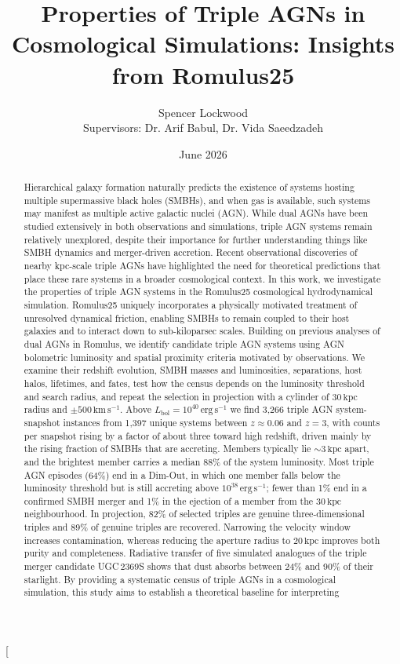 \documentclass[twocolumn, 10pt]{article}
\title{Properties of Triple AGNs in Cosmological Simulations: Insights from Romulus25}
\author{Spencer Lockwood \\ \small Supervisors: Dr. Arif Babul, Dr. Vida Saeedzadeh}
\date{June 2026}
\begin{document}
\onecolumn          %
\tableofcontents
\newpage

\twocolumn[
\begin{@twocolumnfalse}
\maketitle

\begin{abstract}
Hierarchical galaxy formation naturally predicts the existence of systems hosting multiple supermassive black holes (SMBHs), and when gas is available, such systems may manifest as multiple active galactic nuclei (AGN). While dual AGNs have been studied extensively in both observations and simulations, triple AGN systems remain relatively unexplored, despite their importance for further understanding things like SMBH dynamics and merger-driven accretion. Recent observational discoveries of nearby kpc-scale triple AGNs have highlighted the need for theoretical predictions that place these rare systems in a broader cosmological context. In this work, we investigate the properties of triple AGN systems in the Romulus25 cosmological hydrodynamical simulation. Romulus25 uniquely incorporates a physically motivated treatment of unresolved dynamical friction, enabling SMBHs to remain coupled to their host galaxies and to interact down to sub-kiloparsec scales. Building on previous analyses of dual AGNs in Romulus, we identify candidate triple AGN systems using AGN bolometric luminosity and spatial proximity criteria motivated by observations. We examine their redshift evolution, SMBH masses and luminosities, separations, host halos, lifetimes, and fates, test how the census depends on the luminosity threshold and search radius, and repeat the selection in projection with a cylinder of $30\,\mathrm{kpc}$ radius and $\pm 500\,\mathrm{km\,s^{-1}}$. Above $L_\mathrm{bol} = 10^{40}\,\mathrm{erg\,s^{-1}}$ we find 3,266 triple AGN system-snapshot instances from 1,397 unique systems between $z \approx 0.06$ and $z = 3$, with counts per snapshot rising by a factor of about three toward high redshift, driven mainly by the rising fraction of SMBHs that are accreting. Members typically lie $\sim 3\,\mathrm{kpc}$ apart, and the brightest member carries a median 88\% of the system luminosity. Most triple AGN episodes (64\%) end in a Dim-Out, in which one member falls below the luminosity threshold but is still accreting above $10^{38}\,\mathrm{erg\,s^{-1}}$; fewer than 1\% end in a confirmed SMBH merger and 1\% in the ejection of a member from the $30\,\mathrm{kpc}$ neighbourhood. In projection, 82\% of selected triples are genuine three-dimensional triples and 89\% of genuine triples are recovered. Narrowing the velocity window increases contamination, whereas reducing the aperture radius to $20\,\mathrm{kpc}$ improves both purity and completeness. Radiative transfer of five simulated analogues of the triple merger candidate UGC\,2369S shows that dust absorbs between 24\% and 90\% of their starlight. By providing a systematic census of triple AGNs in a cosmological simulation, this study aims to establish a theoretical baseline for interpreting 
\end{abstract}
\end{@twocolumnfalse}
\end{document}
